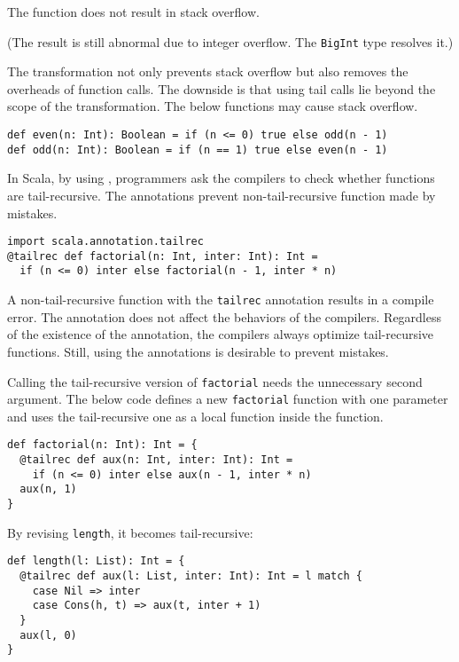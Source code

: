 The function does not result in stack overflow.

(The result is still abnormal due to integer overflow. The \verb!BigInt! type
resolves it.)

The transformation not only prevents stack overflow but also removes the
overheads of function calls. The downside is that  using tail calls lie beyond the scope of the transformation. The below
functions may cause stack overflow.

\begin{verbatim}
def even(n: Int): Boolean = if (n <= 0) true else odd(n - 1)
def odd(n: Int): Boolean = if (n == 1) true else even(n - 1)
\end{verbatim}

In Scala, by using , programmers ask the compilers to check
whether functions are tail-recursive. The annotations prevent non-tail-recursive
function made by mistakes.

\begin{verbatim}
import scala.annotation.tailrec
@tailrec def factorial(n: Int, inter: Int): Int =
  if (n <= 0) inter else factorial(n - 1, inter * n)
\end{verbatim}

A non-tail-recursive function with the \verb!tailrec! annotation results in a
compile error. The annotation does not affect the behaviors of the compilers.
Regardless of the existence of the annotation, the compilers always optimize
tail-recursive functions. Still, using the annotations is desirable to prevent
mistakes.

Calling the tail-recursive version of \verb!factorial! needs the unnecessary
second argument. The below code defines a new \verb!factorial! function with one
parameter and uses the tail-recursive one as a local function inside the
function.

\begin{verbatim}
def factorial(n: Int): Int = {
  @tailrec def aux(n: Int, inter: Int): Int =
    if (n <= 0) inter else aux(n - 1, inter * n)
  aux(n, 1)
}
\end{verbatim}

By revising \verb!length!, it becomes tail-recursive:

\begin{verbatim}
def length(l: List): Int = {
  @tailrec def aux(l: List, inter: Int): Int = l match {
    case Nil => inter
    case Cons(h, t) => aux(t, inter + 1)
  }
  aux(l, 0)
}
\end{verbatim}

